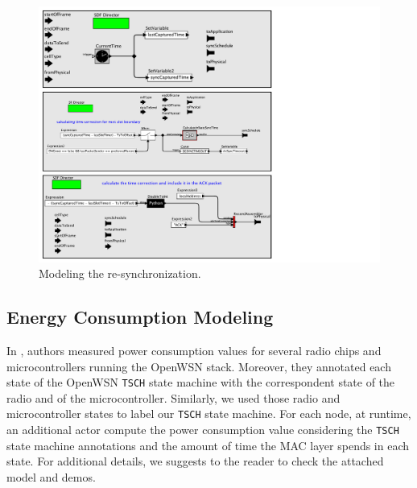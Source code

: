\begin{figure}[t]
\centering
\includegraphics[width=0.9\columnwidth]{figures/PaperReSynchronization}
\caption{Modeling the re-synchronization.}
\label{fig:timeCorrection}
\end{figure}


\subsection{Energy Consumption Modeling}
\label{sec:energy}

In \cite{vilajosana2013realistic}, authors measured power consumption values  for several radio chips and microcontrollers running the OpenWSN stack. Moreover, they annotated each state of the OpenWSN \texttt{TSCH} state machine with the correspondent state of the radio and of the microcontroller.
Similarly, we used those radio and microcontroller states to label our \texttt{TSCH} state machine.
For each node, at runtime, an additional actor compute the power consumption value considering the \texttt{TSCH} state machine annotations and the amount of time the MAC layer spends in each state.
For additional details, we suggests to the reader to check the attached model and demos.



